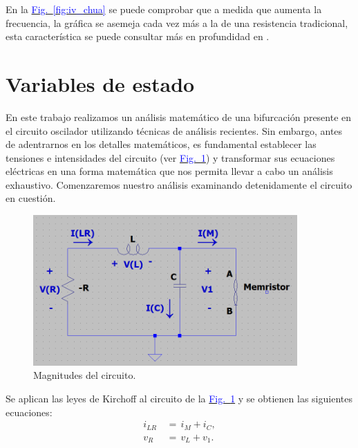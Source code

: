 \documentclass[12pt,a4paper]{report} %
\newcommand{\fref}[1]{\hyperref[#1]{\textcolor{blue}{Fig.~\ref*{#1}}}}
\newcommand{\fref}[1]{\hyperref[#1]{\textcolor{blue}{\textit{Fig.~\ref*{#1}}}}}
\begin{document}
		\vspace{0.5cm} En la \fref{fig:iv_chua} se puede comprobar que a medida que aumenta la frecuencia, la gráfica se asemeja cada vez más a la de una resistencia tradicional, esta característica se puede consultar más en profundidad en \cite{outsiders}.
		
		
	\section{Variables de estado}
	\label{sec:23}
	
	 En este trabajo realizamos un análisis matemático de una bifurcación presente en el circuito oscilador utilizando técnicas de análisis recientes. Sin embargo, antes de adentrarnos en los detalles matemáticos, es fundamental establecer las tensiones e intensidades del circuito (ver \fref{fig:circuito}) y transformar sus ecuaciones eléctricas en una forma matemática que nos permita llevar a cabo un análisis exhaustivo. Comenzaremos nuestro análisis examinando detenidamente el circuito en cuestión.
	
	\vspace{0.5cm}\begin{figure}[h]
		\centering
		\includegraphics[width=0.9\textwidth]{circuito.png}
		\caption{Magnitudes del circuito.}
		\label{fig:circuito}
	\end{figure}\smallskip
	
	\vspace{0.5cm}\noindent Se aplican las leyes de Kirchoff al circuito de la \fref{fig:circuito} y se obtienen las siguientes ecuaciones:
	\begin{subequations}
		\label{kir}
		\begin{align}
			i_{LR}\,&=\,i_M+i_C, \label{eq:kir1}\\[5mm]
			v_R\,&=\,v_L+v_1.    \label{eq:kir2}
		\end{align}
	\end{subequations}\smallskip
	
\end{document}
